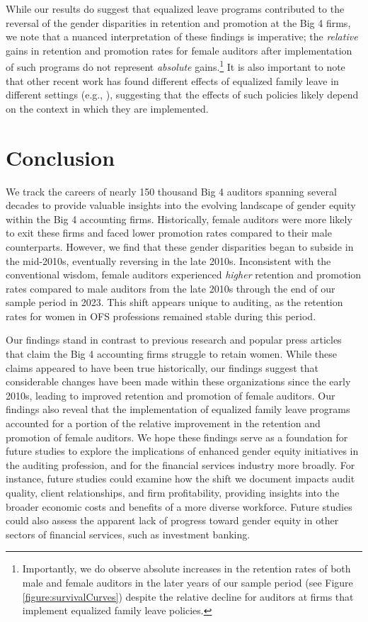\documentclass[11pt]{article}
\begin{document}
            While our results do suggest that equalized leave programs contributed to the reversal of the gender disparities in retention and promotion at the Big 4 firms, we note that a nuanced interpretation of these findings is imperative; the \textit{relative} gains in retention and promotion rates for female auditors after implementation of such programs do not represent \textit{absolute} gains.\footnote{Importantly, we do observe absolute increases in the retention rates of both male and female auditors in the later years of our sample period (see Figure \ref{figure:survivalCurves}) despite the relative decline for auditors at firms that implement equalized family leave policies.} It is also important to note that other recent work has found different effects of equalized family leave in different settings (e.g., \cite{antecolEqualInequitableWho2018}), suggesting that the effects of such policies likely depend on the context in which they are implemented.
            
\section{Conclusion} \label{section:conclusion}
    We track the careers of nearly 150 thousand Big 4 auditors spanning several decades to provide valuable insights into the evolving landscape of gender equity within the Big 4 accounting firms. Historically, female auditors were more likely to exit these firms and faced lower promotion rates compared to their male counterparts. However, we find that these gender disparities began to subside in the mid-2010s, eventually reversing in the late 2010s. Inconsistent with the conventional wisdom, female auditors experienced \textit{higher} retention and promotion rates compared to male auditors from the late 2010s through the end of our sample period in 2023. This shift appears unique to auditing, as the retention rates for women in OFS professions remained stable during this period. 
    
    Our findings stand in contrast to previous research and popular press articles that claim the Big 4 accounting firms struggle to retain women. While these claims appeared to have been true historically, our findings suggest that considerable changes have been made within these organizations since the early 2010s, leading to improved retention and promotion of female auditors. Our findings also reveal that the implementation of equalized family leave programs accounted for a portion of the relative improvement in the retention and promotion of female auditors. We hope these findings serve as a foundation for future studies to explore the implications of enhanced gender equity initiatives in the auditing profession, and for the financial services industry more broadly. For instance, future studies could examine how the shift we document impacts audit quality, client relationships, and firm profitability, providing insights into the broader economic costs and benefits of a more diverse workforce. Future studies could also assess the apparent lack of progress toward gender equity in other sectors of financial services, such as investment banking.
\end{document}
